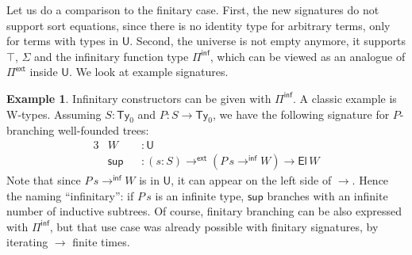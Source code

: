 \documentclass[12pt,a4paper,twoside,openany]{book}
\theoremstyle{remark}
\theoremstyle{definition}
\newtheorem{myexample}{Example}
\theoremstyle{theorem}
\newcommand{\ms}[1]{\mathsf{#1}}
\newcommand{\Ty}{\mathsf{Ty}}
\newcommand{\U}{\mathsf{U}}
\newcommand{\El}{\mathsf{El}}
\newcommand{\Pie}{\Pi^{\mathsf{ext}}}
\newcommand{\toe}{\to^{\ms{ext}}}
\newcommand{\Piinf}{\Pi^{\mathsf{inf}}}
\newcommand{\toinf}{\to^{\ms{inf}}}
\begin{document}
Let us do a comparison to the finitary case. First, the new signatures do not
support sort equations, since there is no identity type for arbitrary terms,
only for terms with types in $\U$. Second, the universe is not empty anymore, it
supports $\top$, $\Sigma$ and the infinitary function type $\Piinf$, which can
be viewed as an analogue of $\Pie$ inside $\U$. We look at example signatures.

\begin{myexample}
Infinitary constructors can be given with $\Piinf$. A classic example is
W-types. Assuming $S : \Ty_0$ and $P : S \to \Ty_0$, we have the following
signature for $P$-branching well-founded trees:
\begin{alignat*}{3}
  &W &&: \U\\
  &\ms{sup} &&: (s : S) \toe (P\,s \toinf W) \to \El\,W
\end{alignat*}
Note that since $P\,s \toinf W$ is in $\U$, it can appear on the left side of
$\to$. Hence the naming ``infinitary'': if $P\,s$ is an infinite type,
$\ms{sup}$ branches with an infinite number of inductive subtrees. Of course,
finitary branching can be also expressed with $\Piinf$, but that use case was
already possible with finitary signatures, by iterating $\to$ finite times.
\end{myexample}
\end{document}
